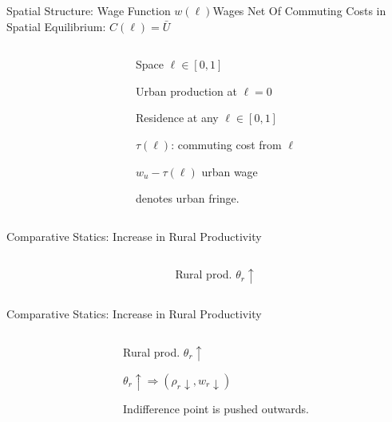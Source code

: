 \documentclass[aspectratio=169]{beamer}
\begin{document}
\begin{frame}{Spatial Structure: Wage Function $w(\ell)$}{Wages Net Of Commuting Costs in Spatial Equilibrium: $C(\ell) = \bar{U}$}
\begin{columns}
\begin{column}{0.7\textwidth}

\end{column}
\begin{column}{0.3\textwidth}
\begin{mide}
\item<1-> Space $\ell \in[0,1]$
\item<2-> Urban production at $\ell=0$
\item<2-> Residence at any $\ell \in[0,1]$
\item<3-> $\tau(\ell)$: commuting cost from $\ell$
\item<3-> $w_u - \tau(\ell)$ urban wage
\item<4-> {\color{red}{$\phi$}} denotes urban fringe.
\end{mide}
\end{column}
\end{columns}
\end{frame}

\begin{frame}{Comparative Statics: Increase in Rural Productivity}

	\begin{columns}
		\begin{column}{0.7\textwidth}
			
		\end{column}
		\begin{column}{0.3\textwidth}
			\begin{midi}
				\item Rural prod. $\theta_r \uparrow$
				
			\end{midi}
		\end{column}
		\end{columns}
	
	
\end{frame}

\begin{frame}{Comparative Statics: Increase in Rural Productivity}

	\begin{columns}
		\begin{column}{0.7\textwidth}
			
		\end{column}
		\begin{column}{0.3\textwidth}
			\begin{midi}
				\item Rural prod. $\theta_r \uparrow$
				\item $\theta_r \uparrow \Rightarrow (\rho_r \downarrow, w_r \downarrow)$
				\item Indifference point is pushed outwards.
			\end{midi}
		\end{column}
		\end{columns}
	
	
\end{frame}
\end{document}
